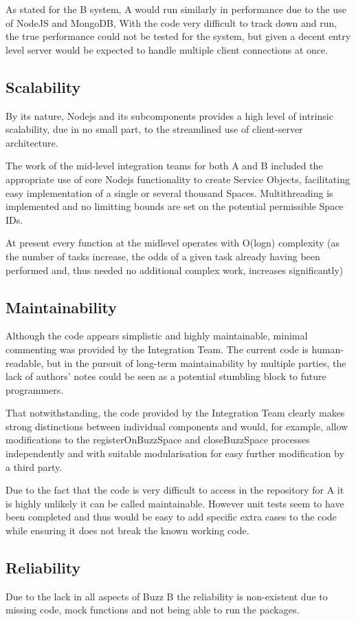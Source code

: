 \documentclass[12pt]{article}
\begin{document}
As stated for the B system, A would run similarly in performance due to the use of NodeJS and MongoDB, With the code very difficult to track down and run, the true performance could not be tested for the system, but given a decent entry level server would be expected to handle multiple client connections at once.
\subsection{Scalability}
By its nature, Nodejs and its subcomponents provides a high level of intrinsic scalability, due in no small part, to the streamlined use of client-server architecture. 

The work of the mid-level integration teams for both A and B included the appropriate use of core Nodejs functionality to create Service Objects, facilitating easy implementation of a single or several thousand Spaces. Multithreading is implemented and no limitting bounds are set on the potential permissible Space IDs.

At present every function at the midlevel operates with O(logn) complexity (as the number of tasks increase, the odds of a given task already having been performed and, thus needed no additional complex work, increases significantly) 

\subsection{Maintainability}
Although the code appears simplistic and highly maintainable, minimal commenting was provided by the Integration Team. The current code is human-readable, but in the pursuit of long-term maintainability by multiple parties, the lack of authors’ notes could be seen as a potential stumbling block to future programmers.

That notwithstanding, the code provided by the Integration Team clearly makes strong distinctions between individual components and would, for example, allow modifications to the registerOnBuzzSpace and closeBuzzSpace processes independently and with suitable modularisation for easy further modification by a third party.

Due to the fact that the code is very difficult to access in the repository for A it is highly unlikely it can be called maintainable. However unit tests seem to have been completed and thus would be easy to add specific extra cases to the code while ensuring it does not break the known working code.
\subsection{Reliability}
Due to the lack in all aspects of Buzz B the reliability is non-existent due to missing code, mock functions and not being able to run the packages.
\end{document}
